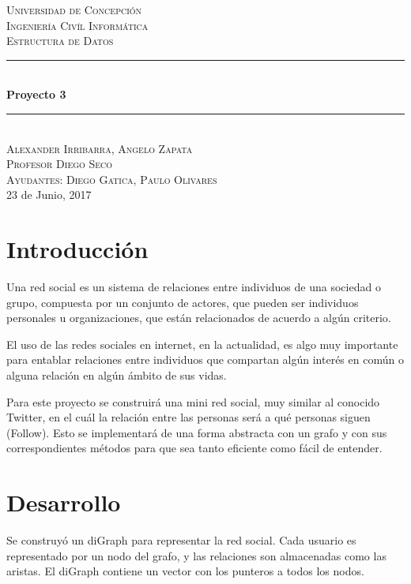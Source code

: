\documentclass[12pt]{article}
\begin{document}
\begin{titlepage}

\newcommand{\HRule}{\rule{\linewidth}{0.5mm}}

\center

\textsc{\LARGE Universidad de Concepci\'on}\\[1.5cm] 
\textsc{\Large Ingenier\'ia Civ\'il Inform\'atica}\\[0.5cm]
\textsc{\large Estructura de Datos}\\[2.5cm]

\HRule \\[0.4cm]
{ \huge \bfseries Proyecto 3}\\[0.4cm]
\HRule \\[3.5cm]

\textsc{\large Alexander Irribarra, Angelo Zapata}\\[0.5cm]
\textsc{Profesor Diego Seco}\\
\textsc{Ayudantes: Diego Gatica, Paulo Olivares}\\[0.5cm]
{\large 23 de Junio, 2017}\\[3cm]

\vfill 
\end{titlepage}
\tableofcontents
\newpage
\section{Introducción}
\indent\indent  Una red social es un sistema de relaciones entre individuos de una sociedad o grupo, compuesta por un conjunto de actores, que pueden ser individuos personales u organizaciones, que están relacionados de acuerdo a algún criterio.

El uso de las redes sociales en internet, en la actualidad, es algo muy importante para entablar relaciones entre individuos que compartan algún interés en común o alguna relación en algún ámbito de sus vidas.

Para este proyecto se construirá una mini red social, muy similar al conocido Twitter, en el cuál la relación entre las personas será a qué personas siguen (Follow). Esto se implementará de una forma abstracta con un grafo y con sus correspondientes métodos para que sea tanto eficiente como fácil de entender.
\newpage
\section{Desarrollo}

\indent\indent Se construyó un diGraph para representar la red social. Cada usuario es representado por un nodo del grafo, y las relaciones son almacenadas como las aristas. El diGraph contiene un vector con los punteros a todos los nodos.		
\end{document}
